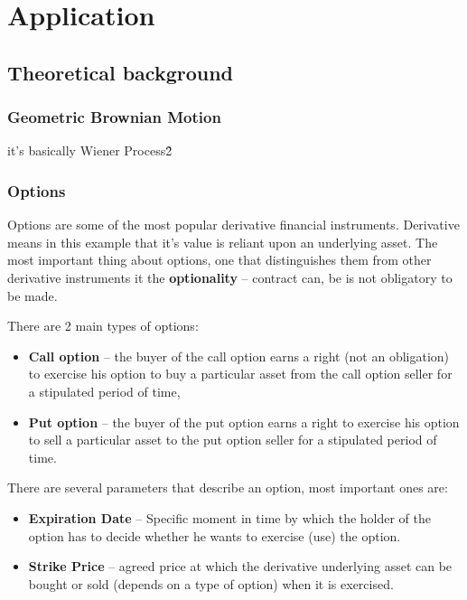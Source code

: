 \chapter{Application}
\section{Theoretical background}

\subsection{Geometric Brownian Motion}
\todo
it's basically Wiener Process\^2

\subsection{Options}
    Options are some of the most popular derivative financial instruments. Derivative means in this example that it's value is reliant upon an underlying asset. The most important thing about options, one that distinguishes them from other derivative instruments it the \textbf{optionality} -- contract can, be is not obligatory to be made.
    
    There are 2 main types of options:
    \begin{itemize}
        \item \textbf{Call option} -- the buyer of the call option earns a right (not an obligation) to exercise his option to buy a particular asset from the call option seller for a stipulated period of time,
        \item \textbf{Put option} -- the buyer of the put option earns a right to exercise his option to sell a particular asset to the put option seller for a stipulated period of time\cite{Call_Put_Option_Definition}.
    \end{itemize}
    
    There are several parameters that describe an option, most important ones are:
    \begin{itemize}
        \item \textbf{Expiration Date} -- Specific moment in time by which the holder of the option has to decide whether he wants to exercise (use) the option.
        \item \textbf{Strike Price} -- agreed price at which the derivative underlying asset can be bought or sold (depends on a type of option) when it is exercised.
    \end{itemize}
    
